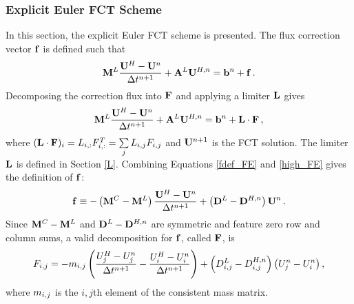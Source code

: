 \subsubsection{Explicit Euler FCT Scheme}
In this section, the explicit Euler FCT scheme is presented.
The flux correction vector $\mathbf{f}$ is defined such that
\begin{equation}\label{fdef_FE}
   \mathbf{M}^L\frac{\mathbf{U}^{H}-\mathbf{U}^n}{\Delta t^{n+1}} + \mathbf{A}^L\mathbf{U}^{H,n} = \mathbf{b}^n + \mathbf{f} \,.
\end{equation}
Decomposing the correction flux into $\mathbf{F}$ and applying a limiter $\mathbf{L}$ gives
\begin{equation}\label{limited_FE}
   \mathbf{M}^L\frac{\mathbf{U}^{H}-\mathbf{U}^n}{\Delta t^{n+1}} + \mathbf{A}^L\mathbf{U}^{H,n} = \mathbf{b}^n + \mathbf{L}\cdot\mathbf{F} \,,
\end{equation}
where $(\mathbf{L}\cdot\mathbf{F})_i = L_{i,:}F_{i,:}^T = \sum\limits_j L_{i,j} F_{i,j}$
and $\mathbf{U}^{n+1}$ is the FCT solution. The limiter $\mathbf{L}$ is
defined in Section \ref{L}.
Combining Equations \eqref{fdef_FE} and \eqref{high_FE}
gives the definition of $\mathbf{f}$:
\begin{equation}\label{f_FE}
   \mathbf{f} \equiv -\left(\mathbf{M}^C-\mathbf{M}^L\right)\frac{\mathbf{U}^H-\mathbf{U}^n}{\Delta t^{n+1}}
   + \left(\mathbf{D}^L-\mathbf{D}^{H,n}\right)\mathbf{U}^n \,.
\end{equation}
Since $\mathbf{M}^C-\mathbf{M}^L$ and $\mathbf{D}^L-\mathbf{D}^{H,n}$ are symmetric
and feature zero row and column sums, a valid decomposition for $\mathbf{f}$,
called $\mathbf{F}$, is
\begin{equation}
   F_{i,j} = -m_{i,j}\left(\frac{U_j^H - U_j^n}{\Delta t^{n+1}}
   - \frac{U_i^H - U_i^n}{\Delta t^{n+1}}\right)
   + \left(D_{i,j}^L-D_{i,j}^{H,n}\right)\left(U_j^n - U_i^n\right),
\end{equation}
where $m_{i,j}$ is the $i,j$th element of the consistent mass matrix.
